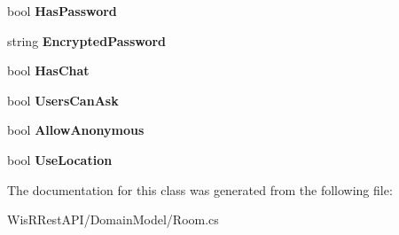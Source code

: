 \begin{DoxyCompactItemize}
\item 
\hypertarget{class_wis_r_1_1_domain_models_1_1_room_a1cc5d4d9a900653743aba2efc88adb81}{}bool {\bfseries Has\+Password}\label{class_wis_r_1_1_domain_models_1_1_room_a1cc5d4d9a900653743aba2efc88adb81}

\item 
\hypertarget{class_wis_r_1_1_domain_models_1_1_room_a9e0c4e1b9d3aa74465aa1a36cf15e2b7}{}string {\bfseries Encrypted\+Password}\label{class_wis_r_1_1_domain_models_1_1_room_a9e0c4e1b9d3aa74465aa1a36cf15e2b7}

\item 
\hypertarget{class_wis_r_1_1_domain_models_1_1_room_a1c79d30639207bbff6f3fa787ef585fb}{}bool {\bfseries Has\+Chat}\label{class_wis_r_1_1_domain_models_1_1_room_a1c79d30639207bbff6f3fa787ef585fb}

\item 
\hypertarget{class_wis_r_1_1_domain_models_1_1_room_aab8ed38ced2bf7efdeb142e7202815ac}{}bool {\bfseries Users\+Can\+Ask}\label{class_wis_r_1_1_domain_models_1_1_room_aab8ed38ced2bf7efdeb142e7202815ac}

\item 
\hypertarget{class_wis_r_1_1_domain_models_1_1_room_a6a8f90d2dfc6e17df9a0f4cc7343fd81}{}bool {\bfseries Allow\+Anonymous}\label{class_wis_r_1_1_domain_models_1_1_room_a6a8f90d2dfc6e17df9a0f4cc7343fd81}

\item 
\hypertarget{class_wis_r_1_1_domain_models_1_1_room_a0e0367ae5a6cc79df6e5103327ca6212}{}bool {\bfseries Use\+Location}\label{class_wis_r_1_1_domain_models_1_1_room_a0e0367ae5a6cc79df6e5103327ca6212}

\end{DoxyCompactItemize}


The documentation for this class was generated from the following file\+:\begin{DoxyCompactItemize}
\item 
Wis\+R\+Rest\+A\+P\+I/\+Domain\+Model/Room.\+cs\end{DoxyCompactItemize}
